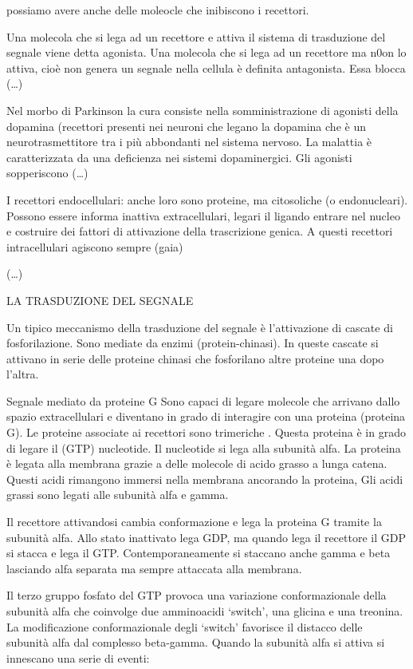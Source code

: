 \documentclass[]{article}
\begin{document}
possiamo avere anche delle moleocle che inibiscono i recettori.

Una molecola che si lega ad un recettore e attiva il sistema di
trasduzione del segnale viene detta agonista. Una molecola che si lega
ad un recettore ma n0on lo attiva, cioè non genera un segnale nella
cellula è definita antagonista. Essa blocca (\ldots{})

Nel morbo di Parkinson la cura consiste nella somministrazione di
agonisti della dopamina (recettori presenti nei neuroni che legano la
dopamina che è un neurotrasmettitore tra i più abbondanti nel sistema
nervoso. La malattia è caratterizzata da una deficienza nei sistemi
dopaminergici. Gli agonisti sopperiscono (\ldots{})

I recettori endocellulari: anche loro sono proteine, ma citosoliche (o
endonucleari). Possono essere informa inattiva extracellulari, legari il
ligando entrare nel nucleo e costruire dei fattori di attivazione della
trascrizione genica. A questi recettori intracellulari agiscono sempre
(gaia)

(\ldots{})

LA TRASDUZIONE DEL SEGNALE

Un tipico meccanismo della trasduzione del segnale è l'attivazione di
cascate di fosforilazione. Sono mediate da enzimi (protein-chinasi). In
queste cascate si attivano in serie delle proteine chinasi che
fosforilano altre proteine una dopo l'altra.

Segnale mediato da proteine G Sono capaci di legare molecole che
arrivano dallo spazio extracellulari e diventano in grado di interagire
con una proteina (proteina G). Le proteine associate ai recettori sono
trimeriche . Questa proteina è in grado di legare il (GTP) nucleotide.
Il nucleotide si lega alla subunità alfa. La proteina è legata alla
membrana grazie a delle molecole di acido grasso a lunga catena. Questi
acidi rimangono immersi nella membrana ancorando la proteina, Gli acidi
grassi sono legati alle subunità alfa e gamma.

Il recettore attivandosi cambia conformazione e lega la proteina G
tramite la subunità alfa. Allo stato inattivato lega GDP, ma quando lega
il recettore il GDP si stacca e lega il GTP. Contemporaneamente si
staccano anche gamma e beta lasciando alfa separata ma sempre attaccata
alla membrana.

Il terzo gruppo fosfato del GTP provoca una variazione conformazionale
della subunità alfa che coinvolge due amminoacidi `switch', una glicina
e una treonina. La modificazione conformazionale degli `switch'
favorisce il distacco delle subunità alfa dal complesso beta-gamma.
Quando la subunità alfa si attiva si innescano una serie di eventi:
\end{document}
